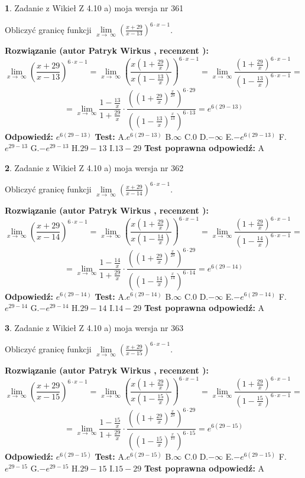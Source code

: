 \documentclass[12pt, a4paper]{article}
\theoremstyle{definition} %
\newtheorem{zad}{}
\newcommand{\zadStart}[1]{\begin{zad}#1\newline}
\newcommand{\zadStop}{\end{zad}}
\newcommand{\rozwStart}[2]{\noindent \textbf{Rozwiązanie (autor #1 , recenzent #2): }\newline}
\newcommand{\rozwStop}{\newline}
\newcommand{\odpStart}{\noindent \textbf{Odpowiedź:}\newline}
\newcommand{\odpStop}{\newline}
\newcommand{\testStart}{\noindent \textbf{Test:}\newline}
\newcommand{\testStop}{\newline}
\newcommand{\kluczStart}{\noindent \textbf{Test poprawna odpowiedź:}\newline}
\newcommand{\kluczStop}{\newline}
\begin{document}
\zadStart{Zadanie z Wikieł Z 4.10 a) moja wersja nr 361}


Obliczyć granicę funkcji  $\lim\limits_{x\to\ \infty}(\frac{x+29}{x-13})^{6\cdot x-1}$.
\zadStop
\rozwStart{Patryk Wirkus}{}
$$\lim\limits_{x\to\ \infty}(\frac{x+29}{x-13})^{6\cdot x-1} = \lim\limits_{x\to\ \infty}(\frac{x(1+\frac{29}{x})}{x(1-\frac{13}{x})})^{6\cdot x-1}=\lim\limits_{x\to\ \infty}\frac{(1+\frac{29}{x})^{6\cdot x-1}}{(1-\frac{13}{x})^{6\cdot x-1}}=$$
$$=\lim\limits_{x\to\ \infty}\frac{1-\frac{13}{x}}{1+\frac{29}{x}}\cdot\frac{((1+\frac{29}{x})^{\frac{x}{29}})^{6\cdot29}}{((1-\frac{13}{x})^{\frac{x}{13}})^{6\cdot13}}=e^{6(29-13)}$$
\rozwStop
\odpStart
$e^{6(29-13)}$
\odpStop
\testStart
A.$e^{6(29-13)}$ B.$\infty$ C.$0$ D.$-\infty$ E.$-e^{6(29-13)}$
F.$e^{29-13}$ G.$-e^{29-13}$
H.$29-13$
I.$13-29$
\testStop
\kluczStart
A
\kluczStop



\zadStart{Zadanie z Wikieł Z 4.10 a) moja wersja nr 362}


Obliczyć granicę funkcji  $\lim\limits_{x\to\ \infty}(\frac{x+29}{x-14})^{6\cdot x-1}$.
\zadStop
\rozwStart{Patryk Wirkus}{}
$$\lim\limits_{x\to\ \infty}(\frac{x+29}{x-14})^{6\cdot x-1} = \lim\limits_{x\to\ \infty}(\frac{x(1+\frac{29}{x})}{x(1-\frac{14}{x})})^{6\cdot x-1}=\lim\limits_{x\to\ \infty}\frac{(1+\frac{29}{x})^{6\cdot x-1}}{(1-\frac{14}{x})^{6\cdot x-1}}=$$
$$=\lim\limits_{x\to\ \infty}\frac{1-\frac{14}{x}}{1+\frac{29}{x}}\cdot\frac{((1+\frac{29}{x})^{\frac{x}{29}})^{6\cdot29}}{((1-\frac{14}{x})^{\frac{x}{14}})^{6\cdot14}}=e^{6(29-14)}$$
\rozwStop
\odpStart
$e^{6(29-14)}$
\odpStop
\testStart
A.$e^{6(29-14)}$ B.$\infty$ C.$0$ D.$-\infty$ E.$-e^{6(29-14)}$
F.$e^{29-14}$ G.$-e^{29-14}$
H.$29-14$
I.$14-29$
\testStop
\kluczStart
A
\kluczStop



\zadStart{Zadanie z Wikieł Z 4.10 a) moja wersja nr 363}


Obliczyć granicę funkcji  $\lim\limits_{x\to\ \infty}(\frac{x+29}{x-15})^{6\cdot x-1}$.
\zadStop
\rozwStart{Patryk Wirkus}{}
$$\lim\limits_{x\to\ \infty}(\frac{x+29}{x-15})^{6\cdot x-1} = \lim\limits_{x\to\ \infty}(\frac{x(1+\frac{29}{x})}{x(1-\frac{15}{x})})^{6\cdot x-1}=\lim\limits_{x\to\ \infty}\frac{(1+\frac{29}{x})^{6\cdot x-1}}{(1-\frac{15}{x})^{6\cdot x-1}}=$$
$$=\lim\limits_{x\to\ \infty}\frac{1-\frac{15}{x}}{1+\frac{29}{x}}\cdot\frac{((1+\frac{29}{x})^{\frac{x}{29}})^{6\cdot29}}{((1-\frac{15}{x})^{\frac{x}{15}})^{6\cdot15}}=e^{6(29-15)}$$
\rozwStop
\odpStart
$e^{6(29-15)}$
\odpStop
\testStart
A.$e^{6(29-15)}$ B.$\infty$ C.$0$ D.$-\infty$ E.$-e^{6(29-15)}$
F.$e^{29-15}$ G.$-e^{29-15}$
H.$29-15$
I.$15-29$
\testStop
\kluczStart
A
\kluczStop
\end{document}
